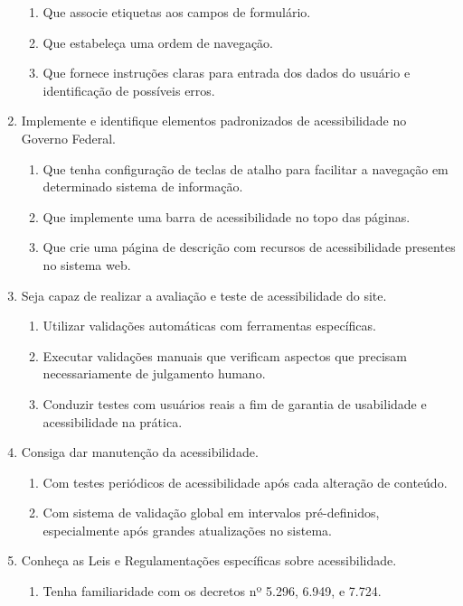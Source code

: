 \documentclass[
  12pt,
  openright,
  twoside,
  a4paper,
  english,
  french,
  spanish,
  brazil
]{abntex2}
\begin{document}
\begin{enumerate}
  \begin{enumerate}
    \item Que associe etiquetas aos campos de formulário.
    \item Que estabeleça uma ordem de navegação.
    \item
      Que fornece instruções claras para entrada dos dados do usuário e
      identificação de possíveis erros.
  \end{enumerate}
  \item
    Implemente e identifique elementos padronizados de acessibilidade no Governo
    Federal.
  \begin{enumerate}
    \item
      Que tenha configuração de teclas de atalho para facilitar a navegação em
      determinado sistema de informação.
    \item Que implemente uma barra de acessibilidade no topo das páginas.
    \item
      Que crie uma página de descrição com recursos de acessibilidade presentes
      no sistema web.
  \end{enumerate}
  \item Seja capaz de realizar a avaliação e teste de acessibilidade do site.
  \begin{enumerate}
    \item Utilizar validações automáticas com ferramentas específicas.
    \item
      Executar validações manuais que verificam aspectos que precisam
      necessariamente de julgamento humano.
    \item
      Conduzir testes com usuários reais a fim de garantia de usabilidade e
      acessibilidade na prática.
  \end{enumerate}
  \item Consiga dar manutenção da acessibilidade.
  \begin{enumerate}
    \item
      Com testes periódicos de acessibilidade após cada alteração de conteúdo.
    \item
      Com sistema de validação global em intervalos pré-definidos, especialmente
      após grandes atualizações no sistema.
  \end{enumerate}
  \item Conheça as Leis e Regulamentações específicas sobre acessibilidade.
  \begin{enumerate}
    \item Tenha familiaridade com os decretos nº 5.296, 6.949, e 7.724.

\end{enumerate}
\end{enumerate}
\end{document}
